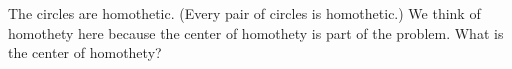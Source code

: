 The circles are homothetic. (Every pair of circles is homothetic.)  We think of homothety here because the center of homothety is part of the problem. What is the center of homothety?























